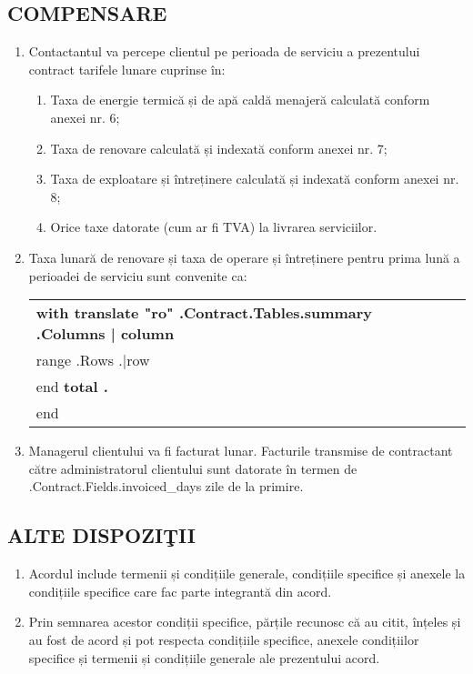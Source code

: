 \subsection{COMPENSARE}
\begin{enumerate}
	\item Contactantul va percepe clientul pe perioada de serviciu a prezentului contract tarifele lunare cuprinse în:
	\begin{enumerate}
		\item Taxa de energie termică și de apă caldă menajeră calculată conform anexei  nr. 6;
		\item Taxa de renovare calculată și indexată conform anexei  nr. 7;
		\item Taxa de exploatare și întreținere calculată și indexată conform anexei nr. 8;
		\item Orice taxe datorate (cum ar fi TVA) la livrarea serviciilor.
	\end{enumerate}
	\item Taxa lunară de renovare și taxa de operare și întreținere pentru prima lună a perioadei de serviciu sunt convenite ca:


\begin{center}
	\begin{tabu}{|X|X|X|X|}\tabucline{}\rowfont[c]\bfseries
	{{with translate "ro" .Contract.Tables.summary}} %
	{{.Columns | column}} \\\tabucline{}
	{{range .Rows}} %
	{{.|row}} \\\tabucline{}
	{{end}}
	\bfseries {{total .}} \\\tabucline{} %
	{{end}}
	\end{tabu}
\end{center}

\item Managerul clientului va fi facturat lunar. Facturile transmise de contractant către administratorul clientului sunt datorate în termen de \iffalse input fields.invoiced_days value="{{.Contract.Fields.invoiced_days}}" type="number" \fi {{.Contract.Fields.invoiced_days}} zile de la primire.
\end{enumerate}

\subsection{ALTE DISPOZIŢII}
\begin{enumerate}
	\item Acordul include termenii și condițiile generale, condițiile specifice și anexele la condițiile specifice care fac parte integrantă din acord.
	\item Prin semnarea acestor condiții specifice, părțile recunosc că au citit, înțeles și au fost de acord și pot respecta condițiile specifice, anexele condițiilor specifice și termenii și condițiile generale ale prezentului acord.
\end{enumerate}

